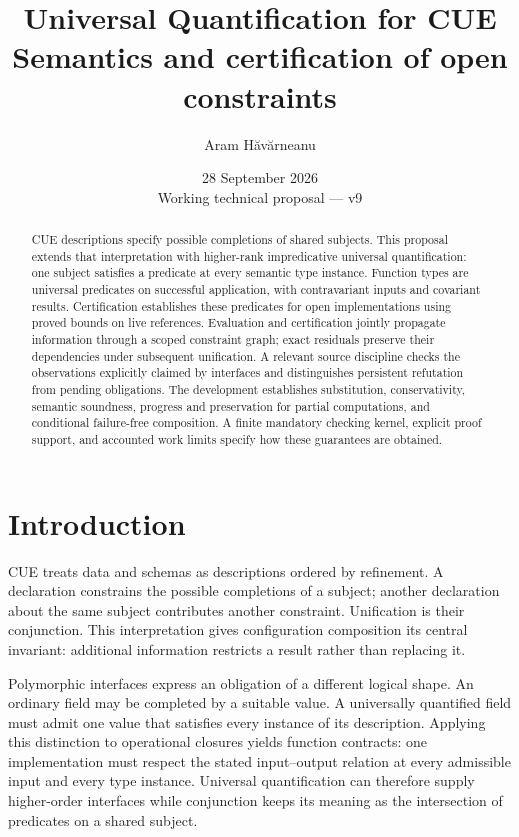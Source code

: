 \documentclass[10pt,a4paper]{article}
\title{\vspace{-7mm}\textbf{Universal Quantification for CUE}\\[3pt]
 \large Semantics and certification of open constraints}
\author{Aram H\u{a}v\u{a}rneanu}
\date{28 September 2026\\[3pt]\small Working technical proposal --- v9}
\theoremstyle{remark}
\begin{document}
\maketitle
\begin{abstract}
CUE descriptions specify possible completions of shared subjects. This proposal
extends that interpretation with higher-rank impredicative universal
quantification: one subject satisfies a predicate at every semantic type
instance. Function types are universal predicates on successful application,
with contravariant inputs and covariant results. Certification establishes these
predicates for open implementations using proved bounds on live references.
Evaluation and certification jointly propagate information through a scoped
constraint graph; exact residuals preserve their dependencies under subsequent
unification. A relevant source discipline checks the observations explicitly
claimed by interfaces and distinguishes persistent refutation from pending
obligations. The development establishes substitution, conservativity, semantic
soundness, progress and preservation for partial computations, and conditional
failure-free composition. A finite mandatory checking kernel, explicit proof
support, and accounted work limits specify how these guarantees are obtained.
\end{abstract}

\section{Introduction}
CUE treats data and schemas as descriptions ordered by refinement. A declaration
constrains the possible completions of a subject; another declaration about the
same subject contributes another constraint. Unification is their conjunction.
This interpretation gives configuration composition its central invariant:
additional information restricts a result rather than replacing it.

Polymorphic interfaces express an obligation of a different logical shape.
An ordinary field may be completed by a suitable value. A universally quantified
field must admit one value that satisfies every instance of its description.
Applying this distinction to operational closures yields function contracts:
one implementation must respect the stated input--output relation at every
admissible input and every type instance. Universal quantification can therefore
supply higher-order interfaces while conjunction keeps its meaning as the
intersection of predicates on a shared subject.
\end{document}
